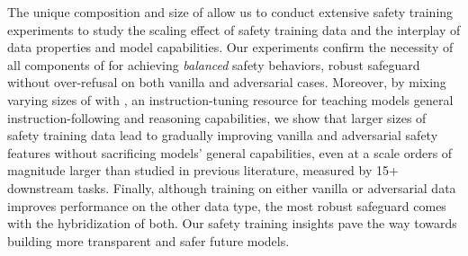 The unique composition and size of \dataset allow us to conduct extensive safety training experiments to study the scaling effect of safety training data and the interplay of data properties and model capabilities. Our experiments confirm the necessity of all components of \dataset for achieving \textit{balanced} safety behaviors, \ie robust safeguard without over-refusal on both vanilla and adversarial cases. Moreover, by mixing varying sizes of \dataset with \tulumix \citep{ivison2023tulu}, an instruction-tuning resource for teaching models general instruction-following and reasoning capabilities, we show that larger sizes of safety training data lead to gradually improving vanilla and adversarial safety features without sacrificing models' general capabilities, even at a scale orders of magnitude larger than studied in previous literature, measured by 15+ downstream tasks. Finally, although training on either vanilla or adversarial data improves performance on the other data type, the most robust safeguard comes with the hybridization of both. Our safety training insights pave the way towards building more transparent and safer future models.
